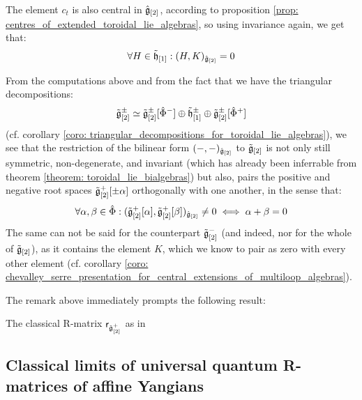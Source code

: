 \begin{remark}
\begin{enumerate}
                The element $c_t$ is also central in $\hat{\mathfrak{g}}_{[2]}$, according to proposition \ref{prop: centres_of_extended_toroidal_lie_algebras}, so using invariance again, we get that:
                    $$\forall H \in \tilde{\mathfrak{h}}_{[1]}: (H, K)_{\hat{\mathfrak{g}}_{[2]}} = 0$$
            \end{enumerate}

            From the computations above and from the fact that we have the triangular decompositions:
                $$\tilde{\mathfrak{g}}_{[2]}^{\pm} \simeq \tilde{\mathfrak{g}}_{[2]}^{\pm}[\hat{\Phi}^-] \oplus \tilde{\mathfrak{h}}_{[1]}^{\pm} \oplus \tilde{\mathfrak{g}}_{[2]}^{\pm}[\hat{\Phi}^+]$$
            (cf. corollary \ref{coro: triangular_decompositions_for_toroidal_lie_algebras}), we see that the restriction of the bilinear form $(-, -)_{\hat{\mathfrak{g}}_{[2]}}$ to $\tilde{\mathfrak{g}}_{[2]}$ is not only still symmetric, non-degenerate, and invariant (which has already been inferrable from theorem \ref{theorem: toroidal_lie_bialgebras}) but also, pairs the positive and negative root spaces $\tilde{\mathfrak{g}}_{[2]}^+[\pm \alpha]$ orthogonally with one another, in the sense that:
                $$\forall \alpha, \beta \in \hat{\Phi}: ( \tilde{\mathfrak{g}}_{[2]}^+[\alpha], \tilde{\mathfrak{g}}_{[2]}^+[\beta] )_{\hat{\mathfrak{g}}_{[2]}} \not = 0 \iff \alpha + \beta = 0$$
            The same can not be said for the  counterpart $\tilde{\mathfrak{g}}_{[2]}^-$ (and indeed, nor for the whole of $\tilde{\mathfrak{g}}_{[2]}$), as it contains the element $K$, which we know to pair as zero with every other element (cf. corollary \ref{coro: chevalley_serre_presentation_for_central_extensions_of_multiloop_algebras}).
        \end{remark}
        The remark above immediately prompts the following result:
        \begin{theorem} \label{theorem: toroidal_casimir_tensors}
            The classical R-matrix $\mathsf{r}_{\tilde{\mathfrak{g}}_{[2]}^+}$ as in 
        \end{theorem}

    \subsection{Classical limits of universal quantum R-matrices of affine Yangians}